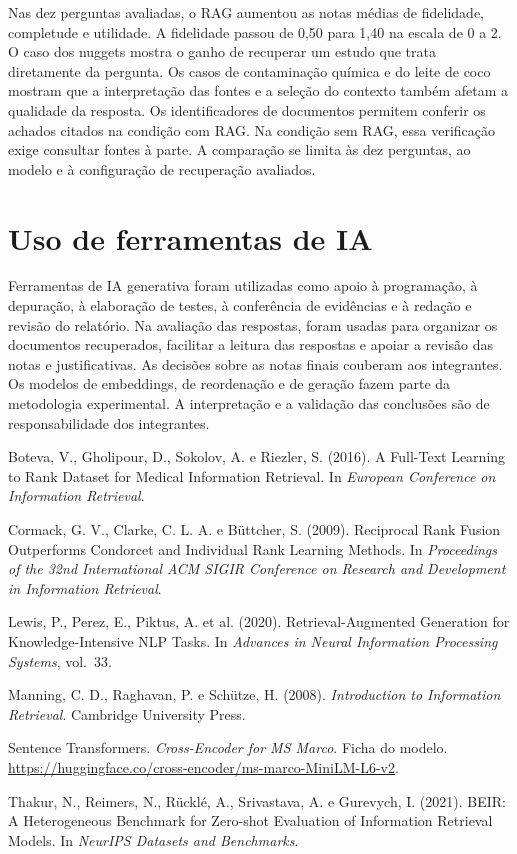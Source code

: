 \documentclass[12pt]{article}
\begin{document}
Nas dez perguntas avaliadas, o RAG aumentou as notas médias de fidelidade,
completude e utilidade. A fidelidade passou de 0,50 para 1,40 na escala de
0 a 2. O caso dos nuggets mostra o ganho de recuperar um estudo que trata
diretamente da pergunta. Os casos de contaminação química e do leite de coco
mostram que a interpretação das fontes e a seleção do contexto também
afetam a qualidade da resposta. Os identificadores de documentos permitem
conferir os achados citados na condição com RAG. Na condição sem RAG, essa
verificação exige consultar fontes à parte. A comparação se limita às dez
perguntas, ao modelo e à configuração de recuperação avaliados.

\section{Uso de ferramentas de IA}

Ferramentas de IA generativa foram utilizadas como
apoio à programação, à depuração, à elaboração de testes, à conferência de
evidências e à redação e revisão do relatório. Na avaliação das respostas,
foram usadas para organizar os documentos recuperados, facilitar a leitura
das respostas e apoiar a revisão das notas e justificativas. As decisões
sobre as notas finais couberam aos integrantes.
Os modelos de embeddings, de reordenação e de geração fazem parte da
metodologia experimental. A interpretação e a validação das conclusões são
de responsabilidade dos integrantes.

\begin{thebibliography}{}
Boteva, V., Gholipour, D., Sokolov, A. e Riezler, S. (2016).
\newblock A Full-Text Learning to Rank Dataset for Medical Information Retrieval.
\newblock In \textit{European Conference on Information Retrieval}.

Cormack, G. V., Clarke, C. L. A. e Büttcher, S. (2009).
\newblock Reciprocal Rank Fusion Outperforms Condorcet and Individual Rank
Learning Methods.
\newblock In \textit{Proceedings of the 32nd International ACM SIGIR Conference
on Research and Development in Information Retrieval}.

Lewis, P., Perez, E., Piktus, A. et al. (2020).
\newblock Retrieval-Augmented Generation for Knowledge-Intensive NLP Tasks.
\newblock In \textit{Advances in Neural Information Processing Systems}, vol.~33.

Manning, C. D., Raghavan, P. e Schütze, H. (2008).
\newblock \textit{Introduction to Information Retrieval}.
\newblock Cambridge University Press.

Sentence Transformers.
\newblock \textit{Cross-Encoder for MS Marco}. Ficha do modelo.
\newblock \url{https://huggingface.co/cross-encoder/ms-marco-MiniLM-L6-v2}.

Thakur, N., Reimers, N., Rücklé, A., Srivastava, A. e Gurevych, I. (2021).
\newblock BEIR: A Heterogeneous Benchmark for Zero-shot Evaluation of
Information Retrieval Models.
\newblock In \textit{NeurIPS Datasets and Benchmarks}.
\end{thebibliography}
\end{document}
